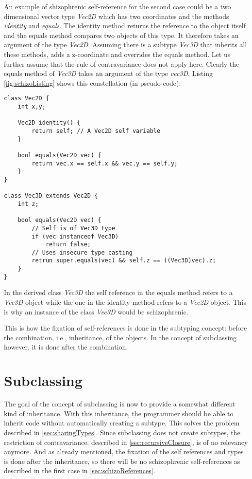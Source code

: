 An example of shizophrenic self-reference for the second case could be
a two dimensional vector type \emph{Vec2D} which has two coordinates
and the methods \emph{identity} and \emph{equals}. The identity method
returns the reference to the object itself and the equals method
compares two objects of this type. It therefore takes an argument
of the type \emph{Vec2D}. Assuming there is a subtype \emph{Vec3D}
that inherits all these methods, adds a z-coordinate and overrides the
equals method. Let us further assume that the rule of contravariance
does not apply here. Clearly the equals method of \emph{Vec3D} takes
an argument of the type \emph{vec3D}. Listing \ref{fig:schizoListing}
shows this constellation (in pseudo-code):

\begin{lstlisting}[float,caption={An example of schizophrenic self-reference},label={fig:schizoListing}]
class Vec2D {
	int x,y;

	Vec2D identity() {
		return self; // A Vec2D self variable
	}

	bool equals(Vec2D vec) {
		return vec.x == self.x && vec.y == self.y;
	}
}

class Vec3D extends Vec2D {
	int z;

	bool equals(Vec2D vec) {
		// Self is of Vec3D type
		if (vec instanceof Vec3D)
			return false;
		// Uses insecure type casting
		retrun super.equals(vec) && self.z == ((Vec3D)vec).z;
	}
}
\end{lstlisting}

In the derived class \emph{Vec3D} the self reference in the equals 
method refers to a \emph{Vec3D} object while the one in the identity method
refers to a \emph{Vec2D} object. This is why an instance of the class
\emph{Vec3D} would be schizophrenic.

This is how the fixation of self-references is done in the subtyping
concept: before the combination, i.e., inheritance, of the objects. In the
concept of subclassing however, it is done after the combination.

\section{Subclassing}
The goal of the concept of subclassing is now to provide a somewhat
different kind of inheritance. With this inheritance, the programmer
should be able to inherit code without automatically creating a subtype.
This solves the problem described in \cref{sec:sharingTypes}. Since
subclassing does not create subtypes, the restriction of contravariance,
described in \cref{sec:recursiveClosure}, is of no relevancy
anymore. And as already mentioned, the fixation of the self references
and types is done after the inheritance, so there will be no schizophrenic
self-references as described in the first case in \cref{sec:schizoReferences}. \\

